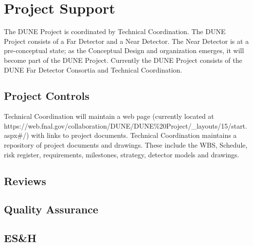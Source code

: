 \section{Project Support}
\label{sec:fdsp-coord-supp}

The DUNE Project is coordinated by Technical Coordination. The DUNE
Project consists of a Far Detector and a Near Detector. The Near
Detector is at a pre-conceptual state; as the Conceptual Design and
organization emerges, it will become part of the DUNE
Project. Currently the DUNE Project consists of the DUNE Far Detector
Consortia and Technical Coordination.



\subsection{Project Controls}
\label{sec:fdsp-coord-controls}

Technical Coordination will maintain a web page (currently located at
{https://web.fnal.gov/collaboration/DUNE/DUNE\%20Project/\_layouts/15/start.aspx\#/})
with links to project documents. Technical Coordination maintains a
repository of project documents and drawings. These include the WBS,
Schedule, risk register, requirements, milestones, strategy, detector
models and drawings.

\subsection{Reviews}
\label{sec:fdsp-coord-reviews}


\subsection{Quality Assurance}
\label{sec:fdsp-coord-qa}


\subsection{ES\&H}
\label{sec:fdsp-coord-esh}


